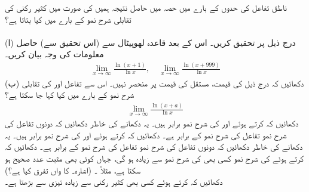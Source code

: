 ناطق تفاعل کی حدوں کے بارے میں حصہ  میں حاصل نتیجہ ہمیں  کی صورت میں کثیر رکنی کی تقابلی   شرح نمو کے بارے میں کیا بتاتا ہے؟\\
\\
(ا) درج ذیل پر تحقیق کریں۔ اس کے بعد قاعدہ لھوپیٹال سے (اس تحقیق سے) حاصل معلومات کی وجہ بیان کریں۔
\begin{align*}
\lim_{x\to\infty}\frac{\ln(x+1)}{\ln x},\quad \lim_{x\to \infty}\frac{\ln(x+999)}{\ln x}
\end{align*}
(ب) دکھائیں کہ درج ذیل کی قیمت، مستقل کی قیمت پر منحصر نہیں۔ اس سے تفاعل  اور  کی تقابلی شرح نمو کے بارے میں کیا کہا جا سکتا ہے؟
\begin{align*}
\lim_{x\to\infty}\frac{\ln(x+a)}{\ln x}
\end{align*}
دکھائیں کہ  کرتے ہوئے  اور  کی شرح نمو   برابر ہیں۔ یہ دکھانے کی خاطر دکھائیں کہ دونوں تفاعل کی شرح نمو تفاعل  کی  شرح نمو کے برابر ہے۔ 
دکھائیں کہ  کرتے ہوئے  اور  کی شرح نمو   برابر ہیں۔ یہ دکھانے کی خاطر دکھائیں کہ دونوں تفاعل کی شرح نمو تفاعل  کی  شرح نمو کے برابر ہے۔ 
دکھائیں کہ  کرتے ہوئے  کی شرح نمو کسی بھی  کی  شرح نمو سے زیادہ ہو گی، جہاں  کوئی بھی مثبت عدد صحیح ہو سکتا ہے، مثلاً ۔ (اشارہ۔  کا  واں تفرق کیا ہے؟)
\\
دکھائیں کہ  کرتے ہوئے  کسی بھی کثیر رکنی  سے زیادہ تیزی سے بڑھتا ہے۔
